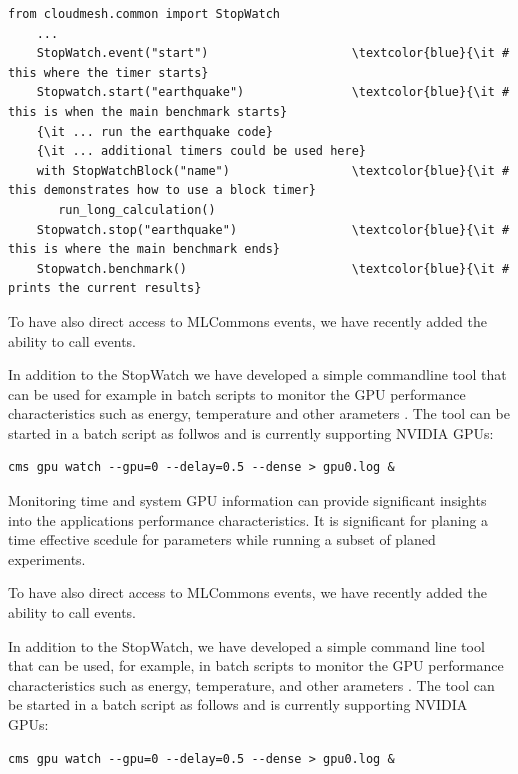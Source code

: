 \documentclass[utf8]{FrontiersinVancouver} %
\begin{document}
{\footnotesize
\begin{Verbatim}[commandchars=\\\{\}]
    from cloudmesh.common import StopWatch 
    ...
    StopWatch.event("start")                    \textcolor{blue}{\it # this where the timer starts}
    Stopwatch.start("earthquake")               \textcolor{blue}{\it # this is when the main benchmark starts}
    {\it ... run the earthquake code}
    {\it ... additional timers could be used here}
    with StopWatchBlock("name")                 \textcolor{blue}{\it # this demonstrates how to use a block timer}
       run_long_calculation()
    Stopwatch.stop("earthquake")                \textcolor{blue}{\it # this is where the main benchmark ends}
    Stopwatch.benchmark()                       \textcolor{blue}{\it # prints the current results}
\end{Verbatim}
}

To have also direct access to MLCommons events, we have recently added
the ability to call events.


In addition to the StopWatch we have developed a simple commandline
tool that can be used for example in batch scripts to monitor the GPU
performance characteristics such as energy, temperature and other
arameters \citep{cloudmesh-gpu}. The tool can be started in a batch
script as follwos and is currently supporting NVIDIA GPUs:

{\footnotesize
\begin{Verbatim}[commandchars=\\\{\}]
    cms gpu watch --gpu=0 --delay=0.5 --dense > gpu0.log &
\end{Verbatim}
}


Monitoring time and system GPU information can provide significant
insights into the applications performance characteristics. It is
significant for planing a time effective scedule for parameters while
running a subset of planed experiments.


To have also direct access to MLCommons events, we have recently added
the ability to call events.


In addition to the StopWatch, we have developed a simple command line
tool that can be used, for example, in batch scripts to monitor the
GPU performance characteristics such as energy, temperature, and other
arameters \citep{cloudmesh-gpu}. The tool can be started in a batch
script as follows and is currently supporting NVIDIA GPUs:

{\footnotesize
\begin{Verbatim}[commandchars=\\\{\}]
    cms gpu watch --gpu=0 --delay=0.5 --dense > gpu0.log &
\end{Verbatim}
}
\end{document}

